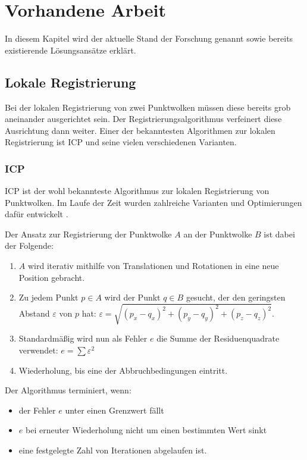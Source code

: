 
\chapter{Vorhandene Arbeit}
\label{ch:vorhandene-arbeit}

In diesem Kapitel wird der aktuelle Stand der Forschung genannt sowie bereits existierende Lösungsansätze erklärt.


\section{Lokale Registrierung}
\label{sec:local-registration}

Bei der lokalen Registrierung von zwei Punktwolken müssen diese bereits grob aneinander ausgerichtet sein.
Der Registrierungsalgorithmus verfeinert diese Ausrichtung dann weiter.
Einer der bekanntesten Algorithmen zur lokalen Registrierung ist \ac{ICP} und seine vielen verschiedenen Varianten.


\subsection{\acl{ICP}}
\label{subsec:icp}

\ac{ICP} \cite{besl1992method} ist der wohl bekannteste Algorithmus zur lokalen Registrierung von Punktwolken.
Im Laufe der Zeit wurden zahlreiche Varianten und Optimierungen dafür entwickelt \cite{rusinkiewicz2001efficient, bouaziz2013sparse}.

Der Ansatz zur Registrierung der Punktwolke $A$ an der Punktwolke $B$ ist dabei der Folgende:
\begin{enumerate}
\item $A$ wird iterativ mithilfe von Translationen und Rotationen \cite{horn1987closed} in eine neue Position gebracht.
\item Zu jedem Punkt $p \in A$ wird der Punkt $q \in B$ gesucht, der den geringsten Abstand $\varepsilon$ von $p$ hat: $\varepsilon = \sqrt{(p_x - q_x)^2 + (p_y - q_y)^2 + (p_z - q_z)^2}$.
\item Standardmäßig wird nun als Fehler $e$ die Summe der Residuenquadrate verwendet: $e = \sum \varepsilon^2$
\item Wiederholung, bis eine der Abbruchbedingungen eintritt.
\end{enumerate}

Der Algorithmus terminiert, wenn:
\begin{itemize}
\item der Fehler $e$ unter einen Grenzwert fällt
\item $e$ bei erneuter Wiederholung nicht um einen bestimmten Wert sinkt
\item eine festgelegte Zahl von Iterationen abgelaufen ist.
\end{itemize}

